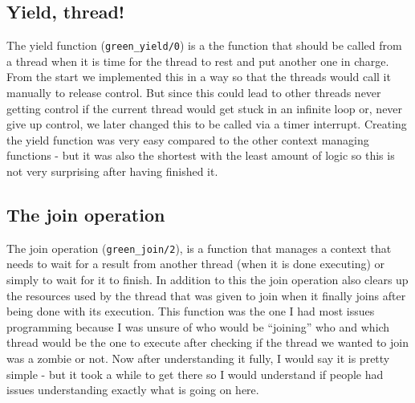 \documentclass[a4paper, 12pt]{article}
\def\code#1{\texttt{#1}}
\begin{document}
\subsection{Yield, thread!}
The yield function (\code{green\_yield/0}) is a the function that should be called from a thread when it is time for the thread to rest and put another one in charge. From the start we implemented this in a way so that the threads would call it manually to release control. But since this could lead to other threads never getting control if the current thread would get stuck in an infinite loop or, never give up control, we later changed this to be called via a timer interrupt.
Creating the yield function was very easy compared to the other context managing functions - but it was also the shortest with the least amount of logic so this is not very surprising after having finished it.

\subsection{The join operation}
The join operation (\code{green\_join/2}), is a function that manages a context that needs to wait for a result from another thread (when it is done executing) or simply to wait for it to finish. In addition to this the join operation also clears up the resources used by the thread that was given to join when it finally joins after being done with its execution. This function was the one I had most issues programming because I was unsure of who would be ``joining'' who and which thread would be the one to execute after checking if the thread we wanted to join was a zombie or not. Now after understanding it fully, I would say it is pretty simple - but it took a while to get there so I would understand if people had issues understanding exactly what is going on here.
\end{document}

